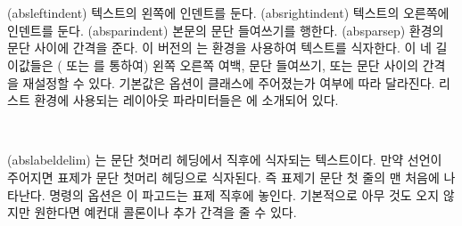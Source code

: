 \begin{syntax}
\lnc{\absleftindent} \lnc{\absrightindent} \\
\lnc{\absparindent} \lnc{\absparsep} \\
\end{syntax}
\glossary(absleftindent)%
  {}%
  { 텍스트의 왼쪽에 인덴트를 둔다.}
\glossary(absrightindent)%
  {}%
  { 텍스트의 오른쪽에 인덴트를 둔다.}
\glossary(absparindent)%
  {}%
  { 본문의 문단 들여쓰기를 행한다.}
\glossary(absparsep)%
  {}%
  { 환경의 문단 사이에 간격을 준다.}
이 버전의 는  환경을 사용하여 텍스트를 식자한다.
이 네 길이값들은 (\cmd{\setlength} 또는 \cmd{\addtolength}를 통하여)
왼쪽 오른쪽 여백, 문단 들여쓰기, 또는 문단 사이의 간격을 재설정할 수 있다.
기본값은  옵션이 클래스에 주어졌는가 여부에 따라 달라진다.
리스트 환경에 사용되는 레이아웃 파라미터들은 에 
소개되어 있다.

\begin{syntax}
\cmd{\abslabeldelim} \\
\end{syntax}
\glossary(abslabeldelim)%
  {}%
  {는 문단 첫머리 헤딩에서  직후에 식자되는 텍스트이다.}
만약 \cmd{\abstractrunin} 선언이 주어지면 표제가 문단 첫머리 헤딩으로 식자된다.
즉 표제기 문단 첫 줄의 맨 처음에 나타난다. \cmd{\abslabeldelim} 명령의  옵션은
이 파고드는 표제 직후에 놓인다. 기본적으로 아무 것도 오지 않지만 원한다면
예컨대 콜론이나 추가 간격을 줄 수 있다.
\begin{lcode}
\abslabeldelim{:\quad}
\end{lcode}

